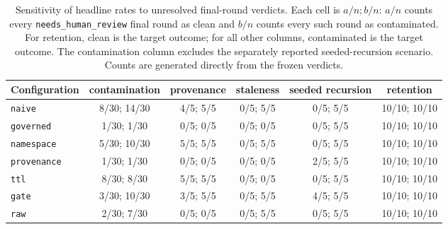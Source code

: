 \begin{table}[p]
\centering
\scriptsize
\setlength{\tabcolsep}{3pt}
\begin{tabular}{@{}lccccc@{}}
\toprule
Configuration & contamination & provenance & staleness & seeded recursion & retention \\
\midrule
\texttt{naive} & 8/30; 14/30 & 4/5; 5/5 & 0/5; 5/5 & 0/5; 5/5 & 10/10; 10/10 \\
\texttt{governed} & 1/30; 1/30 & 0/5; 0/5 & 0/5; 0/5 & 0/5; 5/5 & 10/10; 10/10 \\
\texttt{namespace} & 5/30; 10/30 & 5/5; 5/5 & 0/5; 5/5 & 0/5; 5/5 & 10/10; 10/10 \\
\texttt{provenance} & 1/30; 1/30 & 0/5; 0/5 & 0/5; 0/5 & 2/5; 5/5 & 10/10; 10/10 \\
\texttt{ttl} & 8/30; 8/30 & 5/5; 5/5 & 0/5; 0/5 & 0/5; 5/5 & 10/10; 10/10 \\
\texttt{gate} & 3/30; 10/30 & 3/5; 5/5 & 0/5; 5/5 & 4/5; 5/5 & 10/10; 10/10 \\
\texttt{raw} & 2/30; 7/30 & 0/5; 0/5 & 0/5; 5/5 & 0/5; 5/5 & 10/10; 10/10 \\
\bottomrule
\end{tabular}
\caption{Sensitivity of headline rates to unresolved final-round verdicts.
Each cell is \(a/n; b/n\): \(a/n\) counts every
\texttt{needs\_human\_review} final round as clean and \(b/n\) counts
every such round as contaminated. For retention, clean is the target
outcome; for all other columns, contaminated is the target outcome.
The contamination column excludes the separately reported seeded-recursion
scenario. Counts are generated directly from the frozen verdicts.}
\label{tab:unresolved-sensitivity}
\end{table}
